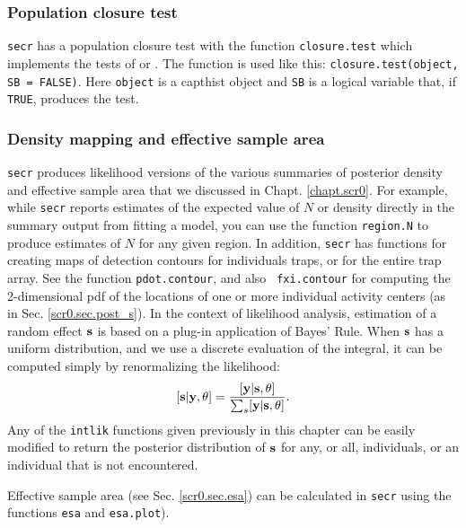 \subsubsection{Population closure test}
\mbox{\tt secr} has a population closure test with the function
\mbox{\tt closure.test} which implements the tests of
\citet{stanley_burnham:1999} or \citet{otis_etal:1978}. The function
is used like this: \newline
\mbox{\tt closure.test(object, SB = FALSE)}.
Here \mbox{\tt object} is a 
capthist object and \mbox{\tt SB} is a logical variable that, if
\mbox{\tt TRUE},
produces the 
\citet{stanley_burnham:1999} test. 


\subsubsection{Density mapping and effective sample area}
\mbox{\tt secr} produces likelihood versions of the various summaries
of posterior density and effective sample area that we discussed in
Chapt. \ref{chapt.scr0}. For example, while \mbox{\tt secr} reports
estimates of the expected value of $N$ or density directly in the
summary output from fitting a model, you can use the function
\mbox{\tt region.N} to produce estimates of $N$ for any given region.
In addition, \mbox{\tt secr} has functions for creating maps of
detection contours for individuals traps, or for the entire trap
array. See the function \mbox{\tt pdot.contour}, and also \mbox{\tt
  fxi.contour} for computing the 2-dimensional pdf of the locations of
one or more individual activity centers (as in
Sec. \ref{scr0.sec.post_s}). In the context of likelihood analysis,
estimation of a random effect ${\bf s}$ is based on a plug-in
application of Bayes' Rule.  When ${\bf s}$ has a uniform
distribution, and we use a discrete evaluation of the integral, it can
be computed simply by renormalizing the likelihood:
\[
 [{\bf s}| {\bf y},\theta] = \frac{ [{\bf y} | {\bf s},\theta]  }{ \sum_{s} [{\bf y} | {\bf s},\theta]  }.
\]
Any of the \mbox{\tt intlik} functions given previously in this
chapter can be easily modified to return the posterior distribution of
${\bf s}$ for 
any, or all, individuals, or an individual that is not encountered. 

Effective sample area
(see Sec. \ref{scr0.sec.esa}) 
 can be calculated in
\mbox{\tt secr} 
using the functions
\mbox{\tt esa} and \mbox{\tt esa.plot}). 

